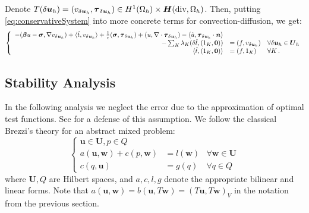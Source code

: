 \documentclass[letterpaper]{article}
\def\btau{\boldsymbol\tau}
\def\bfsigma{\boldsymbol\sigma}
\def\bbeta{\boldsymbol\beta}
\newcommand{\bs}[1]{\boldsymbol{#1}}
\newcommand{\LRp}[1]{\left( #1 \right)}
\newcommand{\bfu}{\boldsymbol u}
\newcommand{\bfU}{\boldsymbol U}
\newcommand{\bfw}{\boldsymbol w}
\newcommand{\bfH}{\mbox{\boldmath $H$}}
\newcommand{\vdeltau}{v_{\delta\bs u_h}}
\newcommand{\taudeltau}{\btau_{\delta\bs u_h}}
\newcommand{\red}[1]{\textcolor{red}{#1}}
\begin{document}
Denote \red{$T(\delta\bfu_h)=\LRp{\vdeltau,\taudeltau}\in
H^1(\Omega_h)\times\bfH(\text{div},\Omega_h)$}.
Then, putting \eqref{eq:conservativeSystem} into more concrete terms for
convection-diffusion, we get:
\begin{equation}
\left\{
\begin{array}[c]{rll}
-(\bbeta u-\bfsigma,\nabla \vdeltau)+\langle\hat t,\vdeltau\rangle
+ \frac{1}{\epsilon}(\bfsigma,\taudeltau)
+(u,\nabla\cdot\taudeltau)
-\langle\hat u,\taudeltau\cdot\bs n\rangle\\
-\sum_K\lambda_K (\delta\hat t,(1_K,\bs0))
&=(f,\vdeltau) & \forall\delta\bs u_h\in\bs U_h\\
\langle\hat t,(1_K,\bs0)\rangle &=(f,1_K) & \forall K\,.
\end{array}
\right.
\label{eq:conservativeConfusionSystem}
\end{equation}

\subsection{Stability Analysis}

In the following analysis we neglect the error due to the approximation of optimal test functions.
See \cite{GopalakrishnanQiu11} for a defense of this assumption.
We follow the classical Brezzi's theory \cite{Brezzi1974,DBB05} for an abstract
mixed problem:
\begin{equation}
\left\{
\begin{array}{lll}
\bfu \in \bfU, p \in Q\\
a(\bfu,\bfw) + c(p,\bfw) & = l(\bfw) & \forall \bfw \in \bfU \\
c(q,\bfu) & = g(q) & \forall q \in Q
\end{array}
\right.
\end{equation}
where $\bfU,Q$ are Hilbert spaces, and $a,c,l,g$ denote the appropriate
bilinear and linear forms. Note that $a(\bfu,\bfw)=b(\bfu,T\bfw)=(T\bfu,T\bfw)_V$ in
the notation from the previous section.
\end{document}
